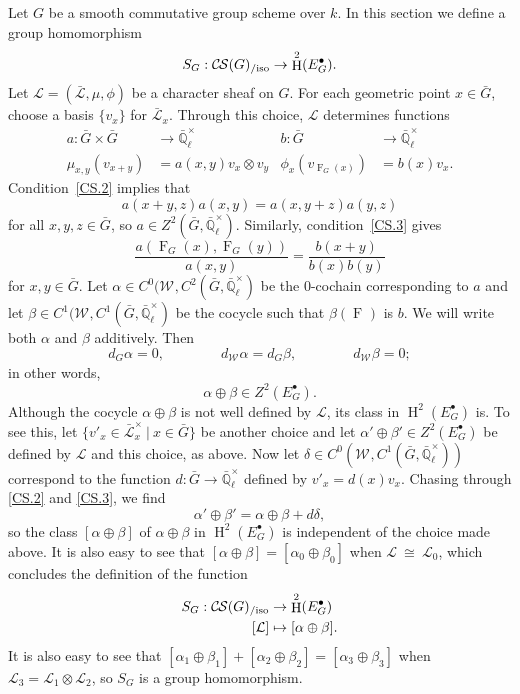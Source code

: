 \documentclass[10pt]{amsart}
\theoremstyle{plain}
\theoremstyle{definition}
\newcommand{\EE}{\mathbb{\bar Q}_\ell}
\newcommand{\Fq}{k}
\newcommand{\EEx}{\EE^\times}
\newcommand{\Weil}[1]{\mathcal{W}_{#1}}
\newcommand{\Frob}[1]{\operatorname{F}_{#1}}
\DeclareMathOperator{\Hh}{H}
\newcommand{\tq}{{\ \vert\ }}
\newcommand{\iso}{{\ \cong\ }}
\newcommand{\cs}[1]{{\mathcal{#1}}}
\newcommand{\gcs}[1]{{\mathcal{\bar #1}}}
\newcommand{\CS}{{\mathcal{C\hskip-0.8pt S}}}
\newcommand{\CSiso}[1]{\CS(#1)_{/\text{iso}}}
\newcommand{\bG}{\bar{G}}
\begin{document}
Let $G$ be a smooth commutative group scheme over $\Fq$.
In this section we define a group homomorphism
\[
S_G : \CSiso{G} \to \Hh^2(E^\bullet_G).
\] 
Let $\cs{L} = (\gcs{L},\mu,\phi)$ be a character sheaf on $G$.
For each geometric point $x\in \bG$, choose a basis $\{ v_x \}$ for $\gcs{L}_x$.
Through this choice, $\cs{L}$ determines functions
\begin{align*}
a : \bG\times \bG &\to \EEx & b : \bG &\to \EEx \\
\mu_{x,y}(v_{x+y}) &= a(x,y) v_x \otimes v_y & \phi_x(v_{\Frob{G}(x)}) &= b(x) v_x.
\end{align*}
Condition~\ref{CS.2} implies that
\begin{equation}\label{2-cocyle}
a(x+y,z) a(x,y) = a(x,y+z) a(y,z)
\end{equation}
for all $x,y,z\in \bG$, so $a \in Z^2(\bG,\EEx)$.  Similarly, condition~\ref{CS.3} gives
\begin{equation}\label{nohom}
\frac{a(\Frob{G}(x),\Frob{G}(y))}{a(x,y)} =  \frac{b(x+y)}{b(x) b(y)}
\end{equation}
for $x, y \in \bG$.
Let $\alpha \in C^0(\Weil{},C^2(\bG,\EEx)$ be the $0$-cochain corresponding to $a$ and let $\beta\in C^1(\Weil{},C^1(\bG,\EEx)$ be the cocycle such that $\beta(\Frob{})$ is $b$.  We will write both $\alpha$ and $\beta$ additively.
Then
\[
d_G\alpha =0, \qquad\qquad
d_{\Weil{}} \alpha = d_{G} \beta,\qquad\qquad
d_{\Weil{}} \beta =0;
\]
in other words,
\[\alpha\oplus \beta \in Z^2(E^\bullet_G).\]
Although the cocycle $\alpha\oplus \beta$ is not well defined by $\cs{L}$, its class in $\Hh^2(E^\bullet_G)$ is.
To see this, let $\{ v'_x \in \gcs{L}_x^\times \tq x \in \bG\}$ be another choice and let $\alpha'\oplus \beta' \in Z^2(E^\bullet_G)$ be defined by $\cs{L}$ and this choice, as above.
Now let $\delta \in C^0(\Weil{},C^1(\bG,\EEx))$ correspond to the function $d : \bG\to \EEx$ defined by $v'_x = d(x) v_x$.
Chasing through \ref{CS.2} and \ref{CS.3}, we find
\[
\alpha'\oplus\beta' = \alpha\oplus\beta + d\delta,
\]
so the class $[\alpha\oplus\beta]$ of $\alpha\oplus\beta$ in $\Hh^2(E^\bullet_G)$ is independent of the choice made above. It is also easy to see that $[\alpha\oplus\beta] = [\alpha_0\oplus\beta_0]$ when $\cs{L} \iso \cs{L}_0$,
which concludes the definition of the function
\begin{align*}
S_G : \CSiso{G} &\to \Hh^2(E^\bullet_G)\\
[\cs{L}] &\mapsto [\alpha\oplus \beta].
\end{align*}
It is also easy to see that $[\alpha_1\oplus\beta_1] + [\alpha_2\oplus\beta_2] = [\alpha_3\oplus\beta_3]$ when $\cs{L}_3 = \cs{L}_1\otimes \cs{L}_2$, so $S_G$ is a group homomorphism.
\end{document}
